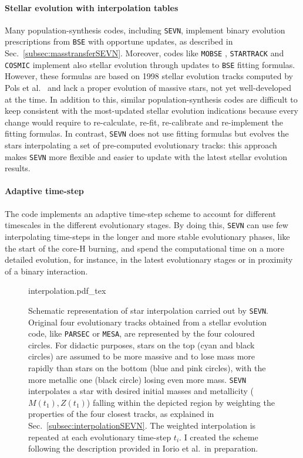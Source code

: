 \documentclass[a4paper,titlepage]{book}     	%
\begin{document}
\paragraph{Stellar evolution with interpolation tables} Many population-synthesis codes, including \texttt{SEVN}, implement binary evolution prescriptions from \texttt{BSE} with opportune updates, as described in Sec.\ \ref{subsec:masstransferSEVN}. Moreover, codes like \texttt{MOBSE} \cite{giacobbomapelli2018_mobse_fryer}, \texttt{STARTRACK} \cite{Belczynski2010_WRwindsSTARTRACK} and \texttt{COSMIC} \cite{breivik2020cosmicpopsynth} implement also stellar evolution through updates to \texttt{BSE} fitting formulas. However, these formulas are based on 1998 stellar evolution tracks computed by Pols et al.\ \cite{Pols1998evotracks} and lack a proper evolution of massive stars, not yet well-developed at the time. In addition to this, similar population-synthesis codes are difficult to keep consistent with the most-updated stellar evolution indications because every change would require to re-calculate, re-fit, re-calibrate and re-implement the fitting formulas. In contrast, \texttt{SEVN} does not use fitting formulas but evolves the stars interpolating a set of pre-computed evolutionary tracks: this approach makes \texttt{SEVN} more flexible and easier to update with the latest stellar evolution results.

\paragraph{Adaptive time-step} The code implements an adaptive time-step scheme to account for different timescales in the different evolutionary stages. By doing this, \texttt{SEVN} can use few interpolating time-steps in the longer and more stable evolutionary phases, like the start of the core-H burning, and spend the computational time on a more detailed evolution, for instance, in the latest evolutionary stages or in proximity of a binary interaction.

\begin{figure}
	\centering
	\def\svgwidth{0.5\textwidth}
	{interpolation.pdf_tex} 
	\caption{Schematic representation of star interpolation carried out by \texttt{SEVN}. Original four evolutionary tracks obtained from a stellar evolution code, like \texttt{PARSEC} or \texttt{MESA}, are represented by the four coloured circles. For didactic purposes, stars on the top (cyan and black circles) are assumed to be more massive and to lose mass more rapidly than stars on the bottom (blue and pink circles), with the more metallic one (black circle) losing even more mass. \texttt{SEVN} interpolates a star with desired initial masses and metallicity ($M(t_1),Z(t_1)$) falling within the depicted region by weighting the properties of the four closest tracks, as explained in Sec.\ \ref{subsec:interpolationSEVN}. The weighted interpolation is repeated at each evolutionary time-step $t_i$. I created the scheme following the description provided in Iorio et al.\ in preparation.}\label{fig:SEVNinterpolation}
\end{figure}
\end{document}
